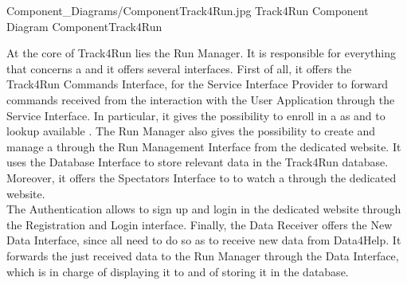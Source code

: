 \documentclass[../../DD.tex]{subfiles}
\begin{document}
	\image {13cm} {Component_Diagrams/ComponentTrack4Run.jpg} {Track4Run Component Diagram} {ComponentTrack4Run}

	At the core of Track4Run lies the Run Manager. It is responsible for everything that concerns a  and it offers several interfaces. First of all, it offers the Track4Run Commands Interface, for the Service Interface Provider to forward commands received from the interaction with the User Application through the Service Interface. In particular, it gives  the possibility to enroll in a  as  and to lookup available . The Run Manager also gives  the possibility to create and manage a  through the Run Management Interface from the  dedicated website. It uses the Database Interface to store relevant data in the Track4Run  database. Moreover, it offers the Spectators Interface to  to watch a  through the  dedicated website.\\
	The Authentication allows  to sign up and login in the dedicated website through the Registration and Login interface.
	Finally, the Data Receiver offers the New Data Interface, since all  need to do so as to receive new data from Data4Help. It forwards the just received data to the Run Manager through the Data Interface, which is in charge of displaying it to  and of storing it in the database.

	\newpage
\end{document}
